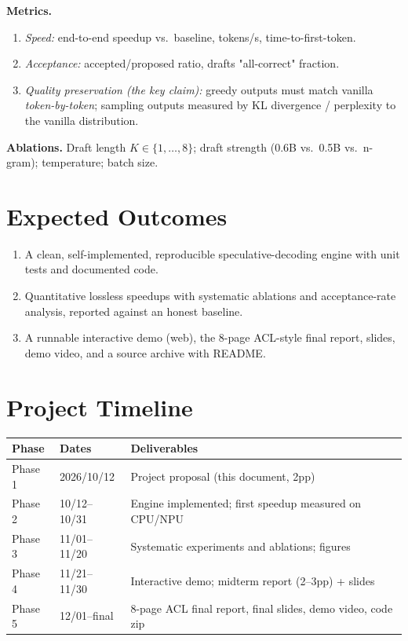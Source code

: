 \documentclass[11pt]{article}
\begin{document}
\textbf{Metrics.}
\begin{enumerate}[label=\arabic*.]
\item \emph{Speed:} end-to-end speedup vs.~baseline, tokens/s, time-to-first-token.
\item \emph{Acceptance:} accepted/proposed ratio, drafts "all-correct" fraction.
\item \emph{Quality preservation (the key claim):} greedy outputs must match
      vanilla \emph{token-by-token}; sampling outputs measured by KL divergence /
      perplexity to the vanilla distribution.
\end{enumerate}

\textbf{Ablations.} Draft length $K \in \{1,\dots,8\}$; draft strength (0.6B vs.~0.5B
vs.~n-gram); temperature; batch size.

\section{Expected Outcomes}
\begin{enumerate}[label=\arabic*.]
\item A clean, self-implemented, reproducible speculative-decoding engine with unit
      tests and documented code.
\item Quantitative lossless speedups with systematic ablations and acceptance-rate
      analysis, reported against an honest baseline.
\item A runnable interactive demo (web), the 8-page ACL-style final report, slides,
      demo video, and a source archive with README.
\end{enumerate}

\section{Project Timeline}
\begin{table}[h]
\centering
\small
\begin{tabular}{llp{5.6cm}}
\toprule
\textbf{Phase} & \textbf{Dates} & \textbf{Deliverables} \\
\midrule
Phase 1 & 2026/10/12 & Project proposal (this document, 2pp) \\
Phase 2 & 10/12--10/31 & Engine implemented; first speedup measured on CPU/NPU \\
Phase 3 & 11/01--11/20 & Systematic experiments and ablations; figures \\
Phase 4 & 11/21--11/30 & Interactive demo; midterm report (2--3pp) + slides \\
Phase 5 & 12/01--final & 8-page ACL final report, final slides, demo video, code zip \\
\bottomrule
\end{tabular}
\end{table}
\end{document}
